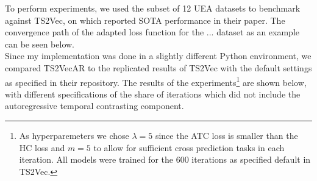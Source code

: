 \documentclass{article}
\begin{document}
To perform experiments, we used the subset of 12 UEA datasets to benchmark against TS2Vec, on which \citet{ts2vec} reported SOTA performance in their paper. The convergence path of the adapted loss function for the ... dataset as an example can be seen below. \\


Since my implementation was done in a slightly different Python environment, we compared TS2VecAR to the replicated results of TS2Vec with the default settings as specified in their repository. The results of the experiments\footnote{As hyperparemeters we chose $\lambda = 5$ since the ATC loss is smaller than the HC loss and $m=5$ to allow for sufficient cross prediction tasks in each iteration. All models were trained for the 600 iterations as specified default in TS2Vec.} are shown below, with different specifications of the share of iterations which did not include the autoregressive temporal contrasting component. \\
\end{document}
